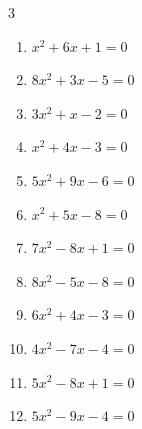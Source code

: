 \begin{multicols}{3}
\begin{enumerate}

  \item $x^{2}+6x+1=0$


  \item $8x^{2}+3x-5=0$


  \item $3x^{2}+x-2=0$


\columnbreak %

  \item $x^{2}+4x-3=0$


  \item $5x^{2}+9x-6=0$


  \item $x^{2}+5x-8=0$


  \item $7x^{2}-8x+1=0$


  \item $8x^{2}-5x-8=0$


  \item $6x^{2}+4x-3=0$


  \item $4x^{2}-7x-4=0$


\columnbreak %

  \item $5x^{2}-8x+1=0$


  \item $5x^{2}-9x-4=0$



\end{enumerate}
\end{multicols}

